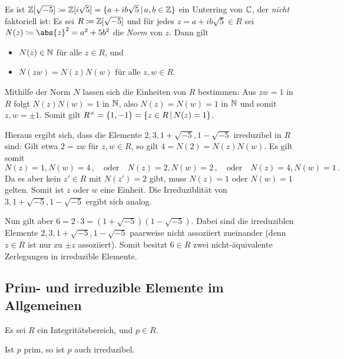 \begin{example}
  Es ist $\Integer[\sqrt{-5}] \defined \Integer[i\sqrt{5}] = \{a + ib\sqrt{5} \suchthat a, b \in \Integer \}$ ein Unterring von $\mathbb{C}$, der \emph{nicht} faktoriell ist:
  Es sei $R \coloneqq \mathbb{Z}[\sqrt{-5}]$ und für jedes $z = a +ib\sqrt{5} \in R$ sei $N(z) \defined \abs{z}^2 = a^2 + 5 b^2$ die \emph{Norm} von $z$.
  Dann gilt
  \begin{itemize}
    \item
      $N(z) \in \mathbb{N}$ für alle $z \in R$, und
    \item
      $N(zw) = N(z) N(w)$ für alle $z, w \in R$.
  \end{itemize}
  
  Mithilfe der Norm $N$ lassen sich die Einheiten von $R$ bestimmen:
  Aus $zw = 1$ in $R$ folgt $N(z)N(w) = 1$ in $\mathbb{N}$, also $N(z) = N(w) = 1$ in $\mathbb{N}$ und somit $z, w = \pm 1$.
  Somit gilt $\unitgroup{R} = \{1, -1\} = \{z \in R \suchthat N(z) = 1\}$.
  
  Hieraus ergibt sich, dass die Elemente $2, 3, 1 + \sqrt{-5}, 1 - \sqrt{-5}$ irreduzibel in $R$ sind:
  Gilt etwa $2 = zw$ für $z,w \in R$, so gilt $4 = N(2) = N(z)N(w)$.
  Es gilt somit
  \[
    N(z) = 1, N(w) = 4 \,,
    \quad\text{oder}\quad
    N(z) = 2, N(w) = 2 \,,
    \quad\text{oder}\quad
    N(z) = 4, N(w) = 1 \,.
  \]
  Da es aber kein $z' \in R$ mit $N(z') = 2$ gibt, muss $N(z) = 1$ oder $N(w) = 1$ gelten.
  Somit ist $z$ oder $w$ eine Einheit.
  Die Irreduziblität von $3, 1 + \sqrt{-5}, 1 - \sqrt{-5}$ ergibt sich analog.
  
  Nun gilt aber $6 = 2 \cdot 3 = (1 + \sqrt{-5})(1 - \sqrt{-5})$.
  Dabei sind die irreduziblen Elemente $2, 3, 1 + \sqrt{-5}, 1 - \sqrt{-5}$ paarweise nicht assoziiert zueinander (denn $z \in R$ ist nur zu $\pm z$ assoziiert).
  Somit besitzt $6 \in R$ zwei nicht-äquivalente Zerlegungen in irreduzible Elemente.
\end{example}




\subsection{Prim- und irreduzible Elemente im Allgemeinen}

Es sei $R$ ein Integritätsbereich, und $p \in R$.

\begin{lemma}
  Ist $p$ prim, so ist $p$ auch irreduzibel.
\end{lemma}

